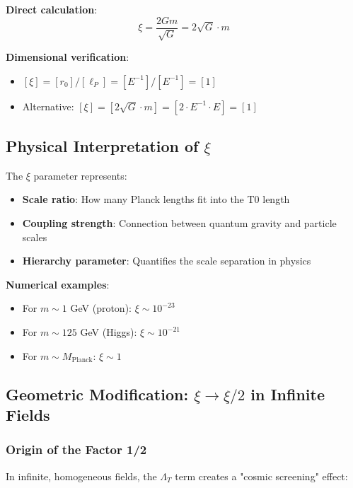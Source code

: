 \documentclass[12pt,a4paper]{article}
\begin{document}
	\textbf{Direct calculation}:
	\begin{equation}
		\xi = \frac{2Gm}{\sqrt{G}} = 2\sqrt{G} \cdot m
	\end{equation}
	
	\textbf{Dimensional verification}:
	\begin{itemize}
		\item $[\xi] = [r_0]/[\ell_P] = [E^{-1}]/[E^{-1}] = [1]$ \checkmark
		\item Alternative: $[\xi] = [2\sqrt{G} \cdot m] = [2 \cdot E^{-1} \cdot E] = [1]$ \checkmark
	\end{itemize}
	
	\subsection{Physical Interpretation of $\xi$}
	\label{subsec:xi_interpretation}
	
	The $\xi$ parameter represents:
	\begin{itemize}
		\item \textbf{Scale ratio}: How many Planck lengths fit into the T0 length
		\item \textbf{Coupling strength}: Connection between quantum gravity and particle scales
		\item \textbf{Hierarchy parameter}: Quantifies the scale separation in physics
	\end{itemize}
	
	\textbf{Numerical examples}:
	\begin{itemize}
		\item For $m \sim 1$ GeV (proton): $\xi \sim 10^{-23}$
		\item For $m \sim 125$ GeV (Higgs): $\xi \sim 10^{-21}$
		\item For $m \sim M_{\text{Planck}}$: $\xi \sim 1$
	\end{itemize}
	
	\subsection{Geometric Modification: $\xi \to \xi/2$ in Infinite Fields}
	\label{subsec:xi_modification}
	
	\subsubsection{Origin of the Factor 1/2}
	\label{subsubsec:factor_half_origin}
	
	In infinite, homogeneous fields, the $\Lambda_T$ term creates a "cosmic screening" effect:
	
\end{document}
